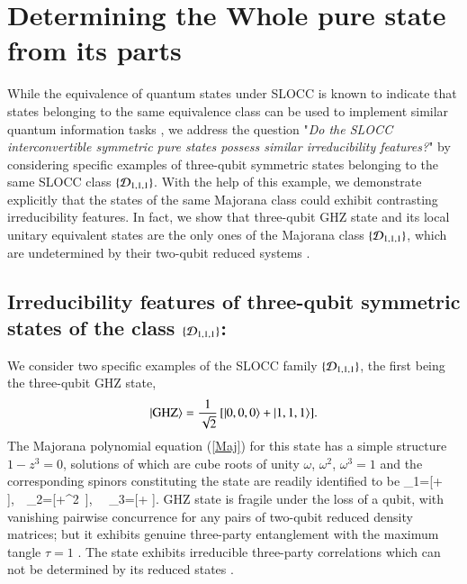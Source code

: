 {\section{Determining the Whole pure state from its parts} 

While the equivalence of quantum states under SLOCC is known to indicate that states belonging to the same equivalence class can be used to implement 
similar quantum information tasks \cite{Dur}, we address the question    
"{\emph{Do the {\rm SLOCC} interconvertible symmetric pure states possess similar irreducibility features?}}" by considering specific examples of three-qubit symmetric states belonging to the same SLOCC class 
$\{{\cal D}_{1,1,1}\}$.  With the help of this example, we demonstrate explicitly that the states of the same Majorana class could exhibit contrasting irreducibility features. In fact, we show that three-qubit GHZ state and its local unitary equivalent states are the only ones of the Majorana class $\{{\cal D}_{1,1,1}\}$,  which are undetermined by their two-qubit reduced systems \cite{SP1,Walck,Walck2}. 


\subsection{Irreducibility features of three-qubit symmetric states of the class $\{{\cal D}_{1,1,1} \}$:}


We consider two specific examples of the SLOCC family $\{{\cal D}_{1,1,1}\}$,  the first being the three-qubit 
GHZ state,  
\begin{equation}
\label{GHZ}
\vert {\rm GHZ}\rangle= \frac{1}{\sqrt{2}}\, [\vert 0,0,0\rangle +  \vert 1,1,1\rangle]. 
\end{equation}      
The Majorana polynomial equation (\ref{Maj}) for this state has a simple structure $1-z^3=0$, solutions of 
which are cube roots of unity $\omega$, $\omega^2$, $\omega^3=1$ and the corresponding spinors constituting the state are readily identified to be 
\be
\vert \epsilon_1\rangle =[\rangle+\omega\, \rangle],\ \  \vert \epsilon_2\rangle =[\rangle+\omega^2\, \rangle], \ \ \vert \epsilon_3\rangle =[\rangle+ \rangle].
\ee 
GHZ state is fragile under the loss of a qubit, with vanishing pairwise concurrence \cite{Wot,Wot2} for any pairs of 
two-qubit reduced density matrices; but it exhibits genuine three-party entanglement \cite{Dur,RaRe} with the 
maximum tangle  $\tau=1$ \cite{Kun}.  The state exhibits irreducible three-party correlations which can not be  
determined by its reduced states \cite{SP1,Walck,Walck2}. 

}

